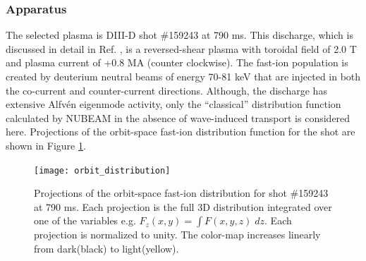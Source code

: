 \subsubsection{Apparatus} \label{sec:apparatus}
The selected plasma is 
DIII-D shot \#159243 at 790 ms. This discharge, which is discussed in detail in
 Ref. \cite{heidbrink2017}, is a reversed-shear plasma with toroidal field of 2.0 T and
plasma current of +0.8 MA (counter clockwise). The fast-ion population is created by
deuterium neutral beams of energy 70-81 keV that are injected in
both the co-current and counter-current directions. Although, the discharge has extensive Alfv\'en
eigenmode activity, only the ``classical'' distribution function calculated by NUBEAM
\cite{NUBEAM} in the absence of wave-induced transport is considered here.
Projections of the orbit-space fast-ion distribution function for the shot are shown in 
Figure \ref{fig:distribution}.
\begin{figure}[ht]
    \centering
    \texttt{[image: orbit\_distribution]}
    \caption{Projections of the orbit-space fast-ion distribution for shot \#159243 at 790 ms. Each projection is the full 3D distribution integrated over one of the variables e.g. $F_z(x,y) = \int F(x,y,z)\;dz$.  Each projection is normalized to unity. The color-map increases linearly from dark(black) to light(yellow).}
    \label{fig:distribution}
\end{figure}



